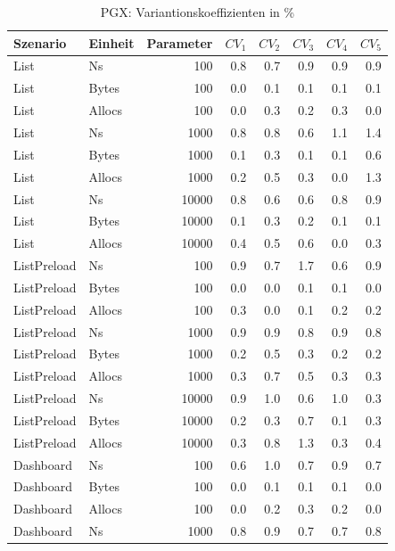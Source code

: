 
\begin{table}[ht]
\setlength{\extrarowheight}{-1pt}
\centering
\caption{PGX: Variantionskoeffizienten in \%}
\begin{tabular}{llrrrrrr}
\toprule
Szenario & Einheit & Parameter & ${CV_1}$ & ${CV_2}$ & ${CV_3}$& ${CV_4}$ & ${CV_5}$ \\
\midrule
	List & Ns & 100 &  0.8 &  0.7 &  0.9 &  0.9 &  0.9 \\
	List & Bytes & 100 &  0.0 &  0.1 &  0.1 &  0.1 &  0.1 \\
	List & Allocs & 100 &  0.0 &  0.3 &  0.2 &  0.3 &  0.0 \\
	List & Ns & 1000 &  0.8 &  0.8 &  0.6 &  1.1 &  1.4 \\
	List & Bytes & 1000 &  0.1 &  0.3 &  0.1 &  0.1 &  0.6 \\
	List & Allocs & 1000 &  0.2 &  0.5 &  0.3 &  0.0 &  1.3 \\
	List & Ns & 10000 &  0.8 &  0.6 &  0.6 &  0.8 &  0.9 \\
	List & Bytes & 10000 &  0.1 &  0.3 &  0.2 &  0.1 &  0.1 \\
	List & Allocs & 10000 &  0.4 &  0.5 &  0.6 &  0.0 &  0.3 \\
	ListPreload & Ns & 100 &  0.9 &  0.7 &  1.7 &  0.6 &  0.9 \\
	ListPreload & Bytes & 100 &  0.0 &  0.0 &  0.1 &  0.1 &  0.0 \\
	ListPreload & Allocs & 100 &  0.3 &  0.0 &  0.1 &  0.2 &  0.2 \\
	ListPreload & Ns & 1000 &  0.9 &  0.9 &  0.8 &  0.9 &  0.8 \\
	ListPreload & Bytes & 1000 &  0.2 &  0.5 &  0.3 &  0.2 &  0.2 \\
	ListPreload & Allocs & 1000 &  0.3 &  0.7 &  0.5 &  0.3 &  0.3 \\
	ListPreload & Ns & 10000 &  0.9 &  1.0 &  0.6 &  1.0 &  0.3 \\
	ListPreload & Bytes & 10000 &  0.2 &  0.3 &  0.7 &  0.1 &  0.3 \\
	ListPreload & Allocs & 10000 &  0.3 &  0.8 &  1.3 &  0.3 &  0.4 \\
	Dashboard & Ns & 100 &  0.6 &  1.0 &  0.7 &  0.9 &  0.7 \\
	Dashboard & Bytes & 100 &  0.0 &  0.1 &  0.1 &  0.1 &  0.0 \\
	Dashboard & Allocs & 100 &  0.0 &  0.2 &  0.3 &  0.2 &  0.0 \\
	Dashboard & Ns & 1000 &  0.8 &  0.9 &  0.7 &  0.7 &  0.8 \\

\end{tabular}
\end{table}
